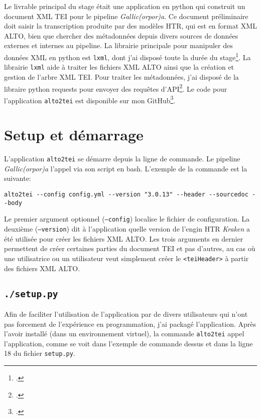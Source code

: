 \documentclass[class=article, crop=false]{standalone}
\begin{document}
Le livrable principal du stage était une application en python qui construit un document \acrshort{XML} \acrshort{TEI} pour le pipeline \textit{Gallic(orpor)a}. Ce document préliminaire doit saisir la transcription produite par des modèles \acrshort{HTR}, qui est en format \acrshort{XML} \acrshort{ALTO}, bien que chercher des métadonnées depuis divers sources de données externes et internes au pipeline. La librairie principale pour manipuler des données \acrshort{XML} en python est \texttt{\gls{lxml}}, dont j'ai disposé toute la durée du stage\footcite{teamLxmlPowerfulPythonic}. La librairie \texttt{lxml} aide à traiter les fichiers \acrshort{XML} \acrshort{ALTO} ainsi que la création et gestion de l'arbre \acrshort{XML} \acrshort{TEI}. Pour traiter les métadonnées, j'ai disposé de la libraire python \gls{requests} pour envoyer des requêtes d'\acrshort{API}\footcite{reitzRequestsPythonHTTP}. Le code pour l'application \texttt{alto2tei} est disponible sur mon GitHub\footcite{christensenAltoTei2022}.

\section{Setup et démarrage}
L'application \texttt{alto2tei} se démarre depuis la ligne de commande. Le pipeline \textit{Gallic(orpor)a} l'appel via son script en bash. L'exemple de la commande est la suivante:
\begin{verbatim}
alto2tei --config config.yml --version "3.0.13" --header --sourcedoc --body
\end{verbatim}
Le premier argument optionnel (\texttt{--config}) localise le fichier de configuration. La deuxième (\texttt{--version}) dit à l'application quelle version de l'engin \acrshort{HTR} \textit{Kraken} a été utilisée pour créer les fichiers \acrshort{XML} \acrshort{ALTO}. Les trois arguments en dernier permettent de créer certaines parties du document \acrshort{TEI} et pas d'autres, au cas où une utilisatrice ou un utilisateur veut simplement créer le \texttt{<teiHeader>} à partir des fichiers \acrshort{XML} \acrshort{ALTO}.

\subsection{\texttt{./setup.py}}
Afin de faciliter l'utilisation de l'application par de divers utilisateurs qui n'ont pas forcement de l'expérience en programmation, j'ai packagé l'application. Après l'avoir installé (dans un environnement virtuel), la commande \texttt{alto2tei} appel l'application, comme se voit dans l'exemple de commande dessus et dans la ligne 18 du fichier \texttt{setup.py}.
\end{document}
